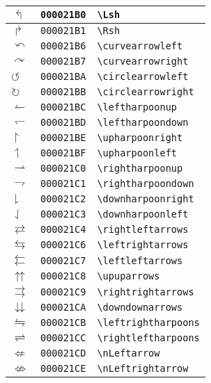 \begin{longtable}{|l|l|l|}
$\Lsh$ & \texttt{000021B0} & \verb|\Lsh| \\
\hline
$\Rsh$ & \texttt{000021B1} & \verb|\Rsh| \\
\hline
$\curvearrowleft$ & \texttt{000021B6} & \verb|\curvearrowleft| \\
\hline
$\curvearrowright$ & \texttt{000021B7} & \verb|\curvearrowright| \\
\hline
$\circlearrowleft$ & \texttt{000021BA} & \verb|\circlearrowleft| \\
\hline
$\circlearrowright$ & \texttt{000021BB} & \verb|\circlearrowright| \\
\hline
$\leftharpoonup$ & \texttt{000021BC} & \verb|\leftharpoonup| \\
\hline
$\leftharpoondown$ & \texttt{000021BD} & \verb|\leftharpoondown| \\
\hline
$\upharpoonright$ & \texttt{000021BE} & \verb|\upharpoonright| \\
\hline
$\upharpoonleft$ & \texttt{000021BF} & \verb|\upharpoonleft| \\
\hline
$\rightharpoonup$ & \texttt{000021C0} & \verb|\rightharpoonup| \\
\hline
$\rightharpoondown$ & \texttt{000021C1} & \verb|\rightharpoondown| \\
\hline
$\downharpoonright$ & \texttt{000021C2} & \verb|\downharpoonright| \\
\hline
$\downharpoonleft$ & \texttt{000021C3} & \verb|\downharpoonleft| \\
\hline
$\rightleftarrows$ & \texttt{000021C4} & \verb|\rightleftarrows| \\
\hline
$\leftrightarrows$ & \texttt{000021C6} & \verb|\leftrightarrows| \\
\hline
$\leftleftarrows$ & \texttt{000021C7} & \verb|\leftleftarrows| \\
\hline
$\upuparrows$ & \texttt{000021C8} & \verb|\upuparrows| \\
\hline
$\rightrightarrows$ & \texttt{000021C9} & \verb|\rightrightarrows| \\
\hline
$\downdownarrows$ & \texttt{000021CA} & \verb|\downdownarrows| \\
\hline
$\leftrightharpoons$ & \texttt{000021CB} & \verb|\leftrightharpoons| \\
\hline
$\rightleftharpoons$ & \texttt{000021CC} & \verb|\rightleftharpoons| \\
\hline
$\nLeftarrow$ & \texttt{000021CD} & \verb|\nLeftarrow| \\
\hline
$\nLeftrightarrow$ & \texttt{000021CE} & \verb|\nLeftrightarrow| \\

\end{longtable}
